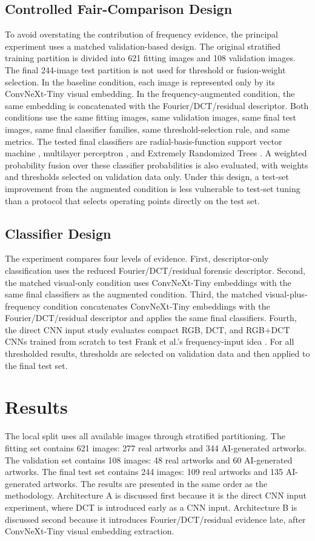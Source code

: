 ﻿\documentclass[10pt,twocolumn]{article}
\begin{document}
\subsection{Controlled Fair-Comparison Design}
To avoid overstating the contribution of frequency evidence, the principal experiment uses a matched validation-based design. The original stratified training partition is divided into 621 fitting images and 108 validation images. The final 244-image test partition is not used for threshold or fusion-weight selection. In the baseline condition, each image is represented only by its ConvNeXt-Tiny visual embedding. In the frequency-augmented condition, the same embedding is concatenated with the Fourier/DCT/residual descriptor. Both conditions use the same fitting images, same validation images, same final test images, same final classifier families, same threshold-selection rule, and same metrics. The tested final classifiers are radial-basis-function support vector machine \cite{cortes}, multilayer perceptron \cite{rumelhart}, and Extremely Randomized Trees \cite{geurts}. A weighted probability fusion over these classifier probabilities is also evaluated, with weights and thresholds selected on validation data only. Under this design, a test-set improvement from the augmented condition is less vulnerable to test-set tuning than a protocol that selects operating points directly on the test set.

\subsection{Classifier Design}
The experiment compares four levels of evidence. First, descriptor-only classification uses the reduced Fourier/DCT/residual forensic descriptor. Second, the matched visual-only condition uses ConvNeXt-Tiny embeddings with the same final classifiers as the augmented condition. Third, the matched visual-plus-frequency condition concatenates ConvNeXt-Tiny embeddings \cite{convnext} with the Fourier/DCT/residual descriptor and applies the same final classifiers. Fourth, the direct CNN input study evaluates compact RGB, DCT, and RGB+DCT CNNs trained from scratch to test Frank et al.'s frequency-input idea \cite{frank}. For all thresholded results, thresholds are selected on validation data and then applied to the final test set.


\section{Results}
The local split uses all available images through stratified partitioning. The fitting set contains 621 images: 277 real artworks and 344 AI-generated artworks. The validation set contains 108 images: 48 real artworks and 60 AI-generated artworks. The final test set contains 244 images: 109 real artworks and 135 AI-generated artworks. The results are presented in the same order as the methodology. Architecture A is discussed first because it is the direct CNN input experiment, where DCT is introduced early as a CNN input. Architecture B is discussed second because it introduces Fourier/DCT/residual evidence late, after ConvNeXt-Tiny visual embedding extraction.
\end{document}
